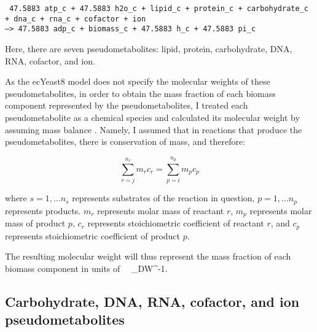 \texttt{
  47.5883 atp\_c + 47.5883 h2o\_c + lipid\_c + protein\_c + carbohydrate\_c\\
  + dna\_c + rna\_c + cofactor + ion \\
  --> 47.5883 adp\_c + biomass\_c + 47.5883 h\_c + 47.5883 pi\_c
}

Here, there are seven pseudometabolites: lipid, protein, carbohydrate, DNA, RNA, cofactor, and ion.

As the ecYeast8 model does not specify the molecular weights of these pseudometabolites, in order to obtain the mass fraction of each biomass component represented by the pseudometabolites,
I treated each pseudometabolite as a chemical species and calculated its molecular weight by assuming mass balance \parencite{chanStandardizingBiomassReactions2017, dinhQuantifyingPropagationParametric2022, takhaveevTemporalSegregationBiosynthetic2023}.
Namely, I assumed that in reactions that produce the pseudometabolites, there is conservation of mass, and therefore:


\begin{equation}
  \sum_{r = j}^{n_{r}}m_{r}c_{r} = \sum_{p = i}^{n_{p}}m_{p}c_{p}
\label{eq:conservation-of-mass}
\end{equation}

where
$s = 1, \ldots n_{s}$ represents substrates of the reaction in question,
$p = 1, \ldots n_{p}$ represents products.
$m_{r}$ represents molar mass of reactant $r$,
$m_{p}$ represents molar mass of product $p$,
$c_{r}$ represents stoichiometric coefficient of reactant $r$, and
$c_{p}$ represents stoichiometric coefficient of product $p$.

The resulting molecular weight will thus represent the mass fraction of each biomass component in units of \SI{}{\gram~\gram_{DW}^{-1}}.


\subsection{Carbohydrate, DNA, RNA, cofactor, and ion pseudometabolites}
\label{append:model-molweights-easy}


